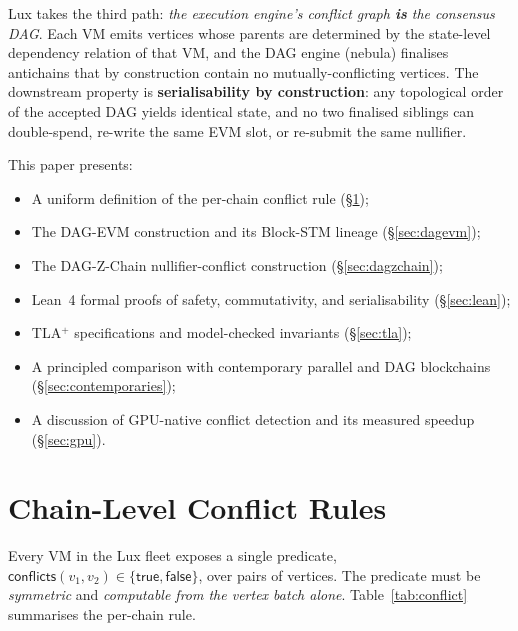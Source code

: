 \documentclass[11pt]{article}
\theoremstyle{definition}
\begin{document}
Lux takes the third path: \emph{the execution engine's conflict graph
\textbf{is} the consensus DAG}. Each VM emits vertices whose parents are
determined by the state-level dependency relation of that VM, and the DAG
engine (nebula) finalises antichains that by construction contain no
mutually-conflicting vertices. The downstream property is
\textbf{serialisability by construction}: any topological order of the
accepted DAG yields identical state, and no two finalised siblings can
double-spend, re-write the same EVM slot, or re-submit the same nullifier.

This paper presents:

\begin{itemize}
  \item A uniform definition of the per-chain conflict rule
    (\S\ref{sec:conflict});
  \item The DAG-EVM construction and its Block-STM lineage
    (\S\ref{sec:dagevm});
  \item The DAG-Z-Chain nullifier-conflict construction
    (\S\ref{sec:dagzchain});
  \item Lean~4 formal proofs of safety, commutativity, and
    serialisability (\S\ref{sec:lean});
  \item TLA$^+$ specifications and model-checked invariants
    (\S\ref{sec:tla});
  \item A principled comparison with contemporary parallel and DAG
    blockchains (\S\ref{sec:contemporaries});
  \item A discussion of GPU-native conflict detection and its measured
    speedup (\S\ref{sec:gpu}).
\end{itemize}

\section{Chain-Level Conflict Rules}
\label{sec:conflict}

Every VM in the Lux fleet exposes a single predicate,
$\mathsf{conflicts}(v_1, v_2) \in \{\mathsf{true},\mathsf{false}\}$,
over pairs of vertices. The predicate must be \emph{symmetric} and
\emph{computable from the vertex batch alone}. Table~\ref{tab:conflict}
summarises the per-chain rule.
\end{document}
